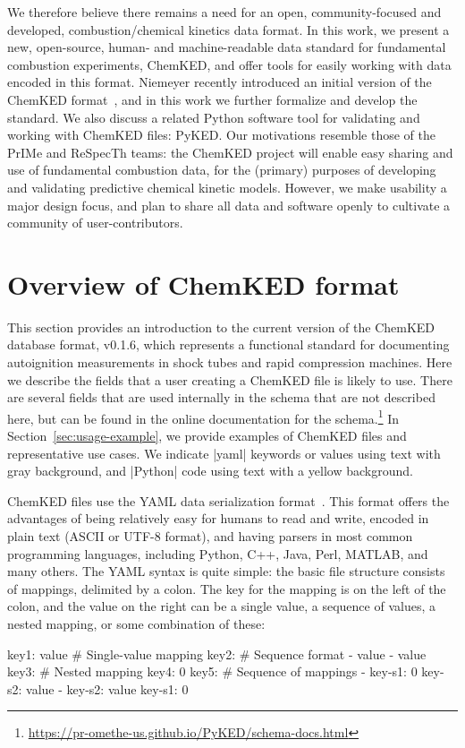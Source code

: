 \documentclass[12pt]{ijck}
\newcommand\ck{ChemKED}
\newcommand\pk{PyKED}
\begin{document}
We therefore believe there remains a need for an open, community-focused and
developed, combustion\slash chemical kinetics data format. In this work, we
present a new, open-source, human- and machine-readable data standard for
fundamental combustion experiments, \ck{}, and offer tools for easily working
with data encoded in this format. Niemeyer recently introduced an initial
version of the \ck{} format~\autocite{Niemeyer:2016wf}, and in this work we
further formalize and develop the standard. We also discuss a related Python
software tool for validating and working with \ck{} files: \pk{}. Our
motivations resemble those of the PrIMe and ReSpecTh teams: the \ck{} project
will enable easy sharing and use of fundamental combustion data, for the
(primary) purposes of developing and validating predictive chemical kinetic
models. However, we make usability a major design focus, and plan to share all
data and software openly to cultivate a community of user-contributors.

\section{Overview of ChemKED format}
\label{sec:overview-of-format}

This section provides an introduction to the current version of the \ck{} database format, v0.1.6,
which represents a functional standard for documenting autoignition measurements in shock tubes and
rapid compression machines. Here we describe the fields that a user creating a \ck{} file is likely
to use. There are several fields that are used internally in the schema that are not described here,
but can be found in the online documentation for the
schema.\footnote{\url{https://pr-omethe-us.github.io/PyKED/schema-docs.html}} In
Section~\ref{sec:usage-example}, we provide examples of \ck{} files and representative use cases. We
indicate \yabox|yaml| keywords or values using text with gray background, and \pybox|Python| code
using text with a yellow background.

\ck{} files use the YAML data serialization format~\autocite{yaml:1.2}. This
format offers the advantages of being relatively easy for humans to read and write,
encoded in plain text (ASCII or UTF-8 format), and
having parsers in most common programming languages, including Python, C++, Java,
Perl, MATLAB, and many others. The YAML syntax is quite simple: the basic file
structure consists of mappings, delimited by a colon. The key for the mapping is
on the left of the colon, and the value on the right can be a single value,
a sequence of values, a nested mapping, or some combination of these:
%
\begin{yamlbox}
key1: value  # Single-value mapping
key2:  # Sequence format
  - value
  - value
key3:  # Nested mapping
  key4: 0
key5:  # Sequence of mappings
  - key-s1: 0
    key-s2: value
  - key-s2: value
    key-s1: 0
\end{yamlbox}
\end{document}
